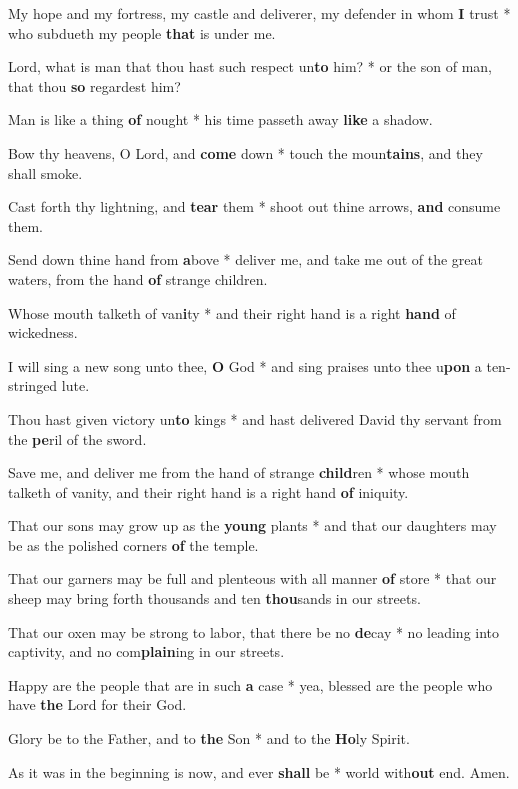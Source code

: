 \begin{multicols}{2}
	My hope and my fortress, my castle and deliverer, my defender in whom \textbf{I} trust * who subdueth my people \textbf{that} is under me.
	
	Lord, what is man that thou hast such respect un\textbf{to} him? * or the son of man, that thou \textbf{so} regardest him?
	
	Man is like a thing \textbf{of} nought * his time passeth away \textbf{like} a shadow.
	
	Bow thy heavens, O Lord, and \textbf{come} down * touch the moun\textbf{tains}, and they shall smoke.
	
	Cast forth thy lightning, and \textbf{tear} them * shoot out thine arrows, \textbf{and} consume them.
	
	Send down thine hand from \textbf{a}bove * deliver me, and take me out of the great waters, from the hand \textbf{of} strange children.
	
	Whose mouth talketh of van\textbf{i}ty * and their right hand is a right \textbf{hand} of wickedness.
	
	I will sing a new song unto thee, \textbf{O} God * and sing praises unto thee u\textbf{pon} a ten-stringed lute.
	
	Thou hast given victory un\textbf{to} kings * and hast delivered David thy servant from the \textbf{pe}ril of the sword.
	
	Save me, and deliver me from the hand of strange \textbf{child}ren * whose mouth talketh of vanity, and their right hand is a right hand \textbf{of} iniquity.
	
	That our sons may grow up as the \textbf{young} plants * and that our daughters may be as the polished corners \textbf{of} the temple.
	
	That our garners may be full and plenteous with all manner \textbf{of} store * that our sheep may bring forth thousands and ten \textbf{thou}sands in our streets.
	
	That our oxen may be strong to labor, that there be no \textbf{de}cay * no leading into captivity, and no com\textbf{plain}ing in our streets.
	
	Happy are the people that are in such \textbf{a} case * yea, blessed are the people who have \textbf{the} Lord for their God.
	
	Glory be to the Father, and to \textbf{the} Son * and to the \textbf{Ho}ly Spirit.
	
	As it was in the beginning is now, and ever \textbf{shall} be * world with\textbf{out} end. Amen.
\end{multicols}